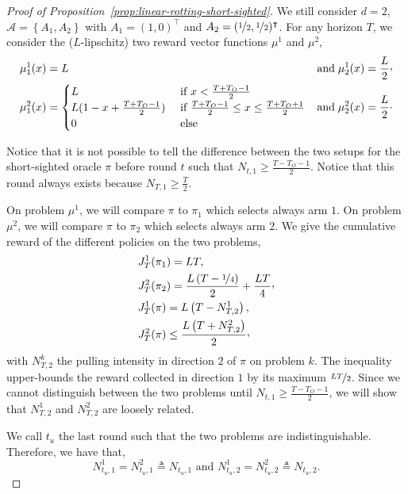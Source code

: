 \begin{proof}[Proof of Proposition~\ref{prop:linear-rotting-short-sighted}]
We still consider $d = 2$, $\mathcal{A} = \left\{ A_1, A_2 \right\}$ with $A_1 = (1,0)^\intercal$ and $A_2 = (\nicefrac{1}{2},\nicefrac{1}{2})^\intercal$. For any horizon $T$, we consider the ($L$-lipschitz) two reward vector functions $\mu^1$ and $\mu^2$,
\begin{align*}
&\mu^1_1(x) = L  & \text{and} \;  \mu^1_2(x) = \frac{L}{2} \CommaBin\\
&\mu^2_1(x) = \begin{cases}
L &\text{ if } x <\frac{T+T_O-1}{2} \\
L(1- x +  \frac{T +T_O -1}{2}) &\text{ if }  \frac{T +T_O-1}{2} \leq x \leq \frac{T +T_O+1}{2}\\
0 &\text{ else}
\end{cases}
 & \text{and} \; \mu^2_2(x) = \frac{L}{2}\cdot
\end{align*}

Notice that it is not possible to tell the difference between the two setups for the short-sighted oracle $\pi$ before round $t$ such that $ N_{t,1} \geq \frac{T -T_O -1}{2}$. Notice that this round always exists because $N_{T,1} \geq \frac{T}{2}$.

On problem $\mu^1$, we will compare $\pi$ to $\pi_1$ which selects always arm $1$. On problem $\mu^2$, we will compare $\pi$ to $\pi_2$ which selects always arm $2$. We give the cumulative reward of the different policies on the two problems,
\begin{align}
&J^1_T(\pi_1) = LT, \label{eq:linear-J1Tpi1}\\ 
&J^2_T(\pi_2) = \frac{L\pa{T -\nicefrac{1}{4}}}{2} + \frac{LT}{4}\CommaBin\label{eq:linear-J2Tpi2}\\
&J^1_T(\pi) = L\pa{T - N^1_{T,2}}, \label{eq:linear-J1Tpi} \\
&J^2_T(\pi) \leq \frac{L\pa{T + N^2_{T,2}}}{2}\CommaBin\label{eq:linear-J2Tpi}
\end{align}
with $N^k_{T,2}$ the pulling intensity in direction $2$ of $\pi$ on problem $k$. The inequality upper-bounds the reward collected in direction $1$ by its maximum $\nicefrac{LT}{2}$. Since we cannot distinguish between the two problems until $N_{t,1} \geq \frac{T - T_O -1}{2} $, we will show that $N^1_{T,2}$ and $N^2_{T,2}$ are loosely related. 

We call $t_u$ the last round such that the two problems are indistinguishable. Therefore, we have that, 
\[
N_{t_u,1}^1 = N_{t_u,1}^2 \triangleq  N_{t_u,1} \text{ and } N_{t_u,2}^1 = N_{t_u,2}^2\triangleq  N_{t_u,2} .
\]


\end{proof}
